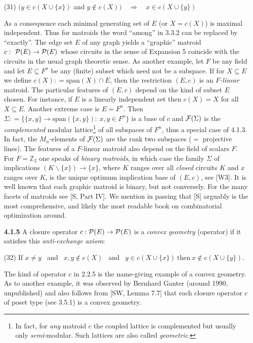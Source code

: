\documentclass[11pt]{article}
\newcommand{\Z}{\mathbb{Z}}
\newcommand{\ra}{\rightarrow}
\newcommand{\Ra}{\Rightarrow}
\begin{document}
(31) \quad $(y \in c(X \cup \{x\})$ and $y \not\in c(X) ) \quad \Ra \quad x \in c(X \cup \{y\})$


As a consequence each minimal generating set of $E$ (or $X = c(X)$) is maximal independent. Thus for matroids the word ``among'' in 3.3.2 can be replaced by ``exactly''. The edge set $E$ of any graph yields a ``graphic'' matroid $c: \ {\cal P}(E) \ra {\cal P}(E)$ whose circuits in the sense of Expansion 5 coincide with the circuits in the usual graph theoretic sense. As another example, let $F$ be any field and let $E \subseteq F^n$ be any (finite) subset which need not be a subspace. If for $X \subseteq E$ we define $c(X) : = \mbox{span}(X) \cap E$, then the restriction $(E, c)$ is an {\it $F$-linear} matroid.  The particular features of  $(E,c)$ depend on the kind of subset $E$ chosen. For instance, if $E$ is a linearly independent set then $c(X) = X$ for all $X \subseteq E$. Another extreme case is $E = F^n$. Then
$\Sigma: = \{ \{x,y\} \ra \mbox{span}(\{x,y\}): \ x, y \in F^n \}$
is a base of $c$ and ${\cal F}(\Sigma)$ is the {\it complemented} modular lattice\footnote{In fact, for {\it any} matroid $c$ the coupled lattice is complemented but usually only {\it semi}-modular. Such lattices are also called {\it geometric}.} of all subspaces of $F^n$, thus a special case of 4.1.3. In fact, the $M_n$-elements of ${\cal F}(\Sigma)$ are the rank two subspaces ($=$ projective lines). The features of  a $F$-linear matroid also depend on the field of scalars $F$. For $F = \Z_2$ one speaks of {\it binary matroids}, in which case the family $\Sigma$ of implications $(K\backslash \{x\}) \ra \{x\}$, where $K$ ranges over all {\it closed} circuits $K$ and $x$ ranges over $K$, is the unique optimum implication base of $(E, c)$, see [W3]. It is well known that each graphic matroid is binary, but not conversely. For the many facets of matroids see [S, Part IV]. We mention in passing that [S] arguably is the most comprehensive, and likely the most readable book on combinatorial optimization around.

{\bf 4.1.5} A closure operator $c: {\cal P}(E) \ra {\cal P}(E)$ is a {\it convex geometry} (operator) if it satisfies this {\it anti-exchange axiom}:

(32) \quad If $x \neq y$ \ and \ $x,y \not\in c(X)$ \ and \ $y \in c(X \cup \{x\}) \ \mbox{then} \ x \not\in c(X \cup \{y\})$.

The kind of operator $c$ in 2.2.5 is the name-giving example of a convex geometry. 
As to another example, it was observed by Bernhard Ganter (around 1990, unpublished) and also follows from [SW, Lemma 7.7] that each closure operator $c$ of poset type (see 3.5.1) is a convex geometry. 
\end{document}
